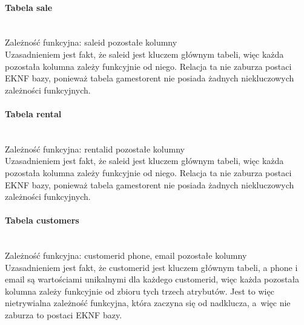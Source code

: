 \documentclass{article}
\begin{document}
	\paragraph{Tabela sale}\mbox{}\vspace{0.2cm} \\
	Zależność funkcyjna: sale\textunderscore id\mbox{} \textrightarrow \mbox{} pozostałe kolumny \vspace{0.2cm} \\
	\noindent Uzasadnieniem jest fakt, że sale\textunderscore id jest kluczem głównym tabeli, więc każda pozostała kolumna zależy funkcyjnie od niego. Relacja ta nie zaburza postaci EKNF bazy, ponieważ tabela games\textunderscore to\textunderscore rent nie posiada żadnych niekluczowych zależności funkcyjnych.
	
	\paragraph{Tabela rental}\mbox{}\vspace{0.2cm} \\
	Zależność funkcyjna: rental\textunderscore id\mbox{} \textrightarrow \mbox{} pozostałe kolumny \vspace{0.2cm} \\
	\noindent Uzasadnieniem jest fakt, że sale\textunderscore id jest kluczem głównym tabeli, więc każda pozostała kolumna zależy funkcyjnie od niego. Relacja ta nie zaburza postaci EKNF bazy, ponieważ tabela games\textunderscore to\textunderscore rent nie posiada żadnych niekluczowych zależności funkcyjnych.
	
	\paragraph{Tabela customers}\mbox{}\vspace{0.2cm} \\
	Zależność funkcyjna: \textbraceleft customer\textunderscore id phone, email\textbraceright \mbox{} \textrightarrow \mbox{} pozostałe kolumny \vspace{0.2cm} \\
	\noindent Uzasadnieniem jest fakt, że customer\textunderscore id jest kluczem głównym tabeli, a phone i email są wartościami unikalnymi dla każdego customer\textunderscore id, więc każda pozostała kolumna zależy funkcyjnie od zbioru tych trzech atrybutów. Jest to więc nietrywialna zależność funkcyjna, która zaczyna się od nadklucza, a~więc nie zaburza to postaci EKNF bazy.
	
\end{document}
